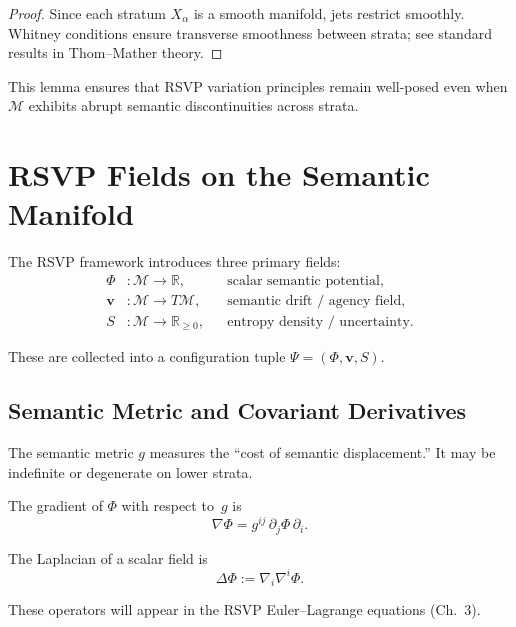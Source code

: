 \begin{proof}
Since each stratum $X_\alpha$ is a smooth manifold, jets restrict smoothly.
Whitney conditions ensure transverse smoothness between strata; see standard
results in Thom--Mather theory.
\end{proof}

This lemma ensures that RSVP variation principles remain well-posed even when
$\mathcal{M}$ exhibits abrupt semantic discontinuities across strata.

\section{RSVP Fields on the Semantic Manifold}

The RSVP framework introduces three primary fields:
\begin{align*}
\Phi &: \mathcal{M} \to \mathbb{R},
&& \text{scalar semantic potential}, \\
\mathbf{v} &: \mathcal{M} \to T\mathcal{M},
&& \text{semantic drift / agency field}, \\
S &: \mathcal{M} \to \mathbb{R}_{\ge 0},
&& \text{entropy density / uncertainty}.
\end{align*}

These are collected into a configuration tuple $\Psi = (\Phi,\mathbf{v},S)$.

\subsection{Semantic Metric and Covariant Derivatives}

The semantic metric $g$ measures the ``cost of semantic displacement.'' It may
be indefinite or degenerate on lower strata.

\begin{definition}
The gradient of $\Phi$ with respect to~$g$ is
\[
\nabla\!\Phi = g^{ij}
\,\partial_j \Phi\, \partial_i .
\]
\end{definition}

\begin{definition}
The Laplacian of a scalar field is
\[
\Delta\Phi := \nabla_i \nabla^i \Phi.
\]
\end{definition}

These operators will appear in the RSVP Euler--Lagrange equations (Ch.~3).

